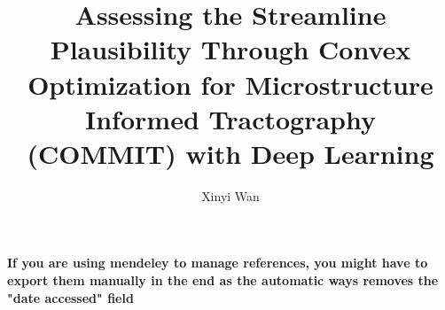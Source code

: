 \documentclass[12pt, openany]{book}
\title{Assessing the Streamline Plausibility Through Convex Optimization for Microstructure Informed Tractography (COMMIT) with Deep Learning}
\author{Xinyi Wan}
\begin{document}






% 

% 



% 

\newpage
{}
\textbf{If you are using mendeley to manage references, you might have to export them manually in the end as the automatic ways removes the "date accessed" field}
\printbibliography





\end{document}
